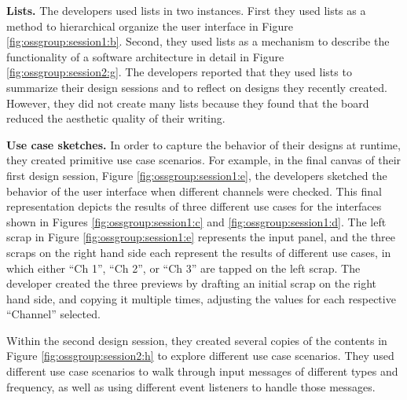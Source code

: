 
\textbf{Lists. } The developers used lists in two instances. First they used lists as a method to hierarchical organize the user interface in Figure \ref{fig:ossgroup:session1:b}. Second, they used lists as a mechanism to describe the functionality of a software architecture in detail in Figure \ref{fig:ossgroup:session2:g}. The developers reported that they used lists to summarize their design sessions and to reflect on designs they recently created. However, they did not create many lists because they found that the board reduced the aesthetic quality of their writing.

\textbf{Use case sketches. } In order to capture the behavior of their designs at runtime, they created primitive use case scenarios. For example, in the final canvas of their first design session, Figure \ref{fig:ossgroup:session1:e}, the developers sketched the behavior of the user interface when different channels were checked. This final representation depicts the results of three different use cases for the interfaces shown in Figures \ref{fig:ossgroup:session1:c} and \ref{fig:ossgroup:session1:d}. The left scrap in Figure \ref{fig:ossgroup:session1:e} represents the input panel, and the three scraps on the right hand side each represent the results of different use cases, in which either ``Ch 1'', ``Ch 2'', or ``Ch 3'' are tapped on the left scrap. The developer created the three previews by drafting an initial scrap on the right hand side, and copying it multiple times, adjusting the values for each respective ``Channel'' selected. 

Within the second design session, they created several copies of the contents in Figure \ref{fig:ossgroup:session2:h} to explore different use case scenarios. They used different use case scenarios to walk through input messages of different types and frequency, as well as using different event listeners to handle those messages.

